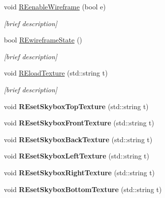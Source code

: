 \begin{DoxyCompactItemize}
\item 
void \hyperlink{class_i_s_e_a07bb014636d0f75ea59303f8fd042db5}{R\-Eenable\-Wireframe} (bool e)
\begin{DoxyCompactList}\small\item\em \mbox{[}brief description\mbox{]} \end{DoxyCompactList}\item 
bool \hyperlink{class_i_s_e_a80f5ce9c8eb7e7a9f5a40b5affd53f34}{R\-Ewireframe\-State} ()
\begin{DoxyCompactList}\small\item\em \mbox{[}brief description\mbox{]} \end{DoxyCompactList}\item 
void \hyperlink{class_i_s_e_a08dbe2845f2abffaeb1645b205da8442}{R\-Eload\-Texture} (std\-::string t)
\begin{DoxyCompactList}\small\item\em \mbox{[}brief description\mbox{]} \end{DoxyCompactList}\item 
\hypertarget{class_i_s_e_a2ac7034804de37e48fcf08a044289009}{void {\bfseries R\-Eset\-Skybox\-Top\-Texture} (std\-::string t)}\label{class_i_s_e_a2ac7034804de37e48fcf08a044289009}

\item 
\hypertarget{class_i_s_e_aa01665c991c962bd7e3f8baaf323b1d0}{void {\bfseries R\-Eset\-Skybox\-Front\-Texture} (std\-::string t)}\label{class_i_s_e_aa01665c991c962bd7e3f8baaf323b1d0}

\item 
\hypertarget{class_i_s_e_ab3e9973c36abd5063f45b28746f2c961}{void {\bfseries R\-Eset\-Skybox\-Back\-Texture} (std\-::string t)}\label{class_i_s_e_ab3e9973c36abd5063f45b28746f2c961}

\item 
\hypertarget{class_i_s_e_af69e9a7d4d700d05d622ea495eb0301d}{void {\bfseries R\-Eset\-Skybox\-Left\-Texture} (std\-::string t)}\label{class_i_s_e_af69e9a7d4d700d05d622ea495eb0301d}

\item 
\hypertarget{class_i_s_e_af169b093ce195a5ea431a20b92e83df9}{void {\bfseries R\-Eset\-Skybox\-Right\-Texture} (std\-::string t)}\label{class_i_s_e_af169b093ce195a5ea431a20b92e83df9}

\item 
\hypertarget{class_i_s_e_a19682b32d3713feacc0f852114a3a77f}{void {\bfseries R\-Eset\-Skybox\-Bottom\-Texture} (std\-::string t)}\label{class_i_s_e_a19682b32d3713feacc0f852114a3a77f}


\end{DoxyCompactItemize}
